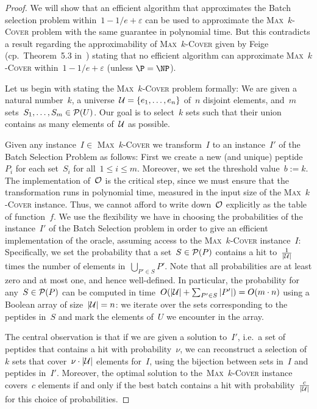 \documentclass[11pt]{article}
\newcommand\maxkcover{\textsc{Max~$k$-Cover}\xspace}
\begin{document}
\begin{proof}
We will show that an efficient algorithm that approximates the Batch selection problem within~$1 - 1/e + \varepsilon$ can be used to approximate the \maxkcover problem with the same guarantee in polynomial time. But this contradicts a result regarding the approximability of \maxkcover given by Feige (cp.\ Theorem~5.3 in~\cite{feige98}) stating that no efficient algorithm can approximate \maxkcover within~$1 - 1/e + \varepsilon$ (unless $\P = \NP$).

Let us begin with stating the \maxkcover problem formally: We are given a natural number~$k$, a universe~${\cal U} = \{e_1,\ldots,e_n\}$ of~$n$ disjoint elements, and~$m$ sets~$S_1,\ldots,S_m \in {\cal P}(U)$. Our goal is to select~$k$ sets such that their union contains as many elements of~$\cal U$ as possible.

Given any instance~$I \in$ \maxkcover we transform~$I$ to an instance~$I'$ of the Batch Selection Problem as follows: First we create a new (and unique) peptide~$P_i$ for each set~$S_i$ for all~$1 \leq i \leq m$. Moreover, we set the threshold value~$b := k$.
%
The implementation of~$\cal O$ is the critical step, since we must ensure that the transformation runs in polynomial time, measured in the input size of the \maxkcover instance. Thus, we cannot afford to write down~$\cal O$ explicitly as the table of function~$f$. We use the flexibility we have in choosing the probabilities of the instance~$I'$ of the Batch Selection problem in order to give an efficient implementation of the oracle, assuming access to the \maxkcover instance~$I$:
Specifically, we set the probability that a set~$S \in {\cal P}(P)$ contains a hit to~$\frac{1}{|\cal U|}$ times the number of elements in~$\bigcup_{P' \in S} P'$. Note that all probabilities are at least zero and at most one, and hence well-defined.
%
In particular, the probability for any~$S \in {\cal P}(P)$ can be computed in time~$O(|{\cal U}| + \sum_{P' \in S}{|P'|}) = O(m\cdot n)$ using a Boolean array of size~$|{\cal U}| = n$: we iterate over the sets corresponding to the peptides in~$S$ and mark the elements of~$U$ we encounter in the array.

The central observation is that if we are given a solution to~$I'$, i.e.\ a set of peptides that contains a hit with probability~$\nu$, we can reconstruct a selection of~$k$ sets that cover~$\nu \cdot |{\cal U}|$ elements for~$I$, using the bijection between sets in~$I$ and peptides in~$I'$.
%
Moreover, the optimal solution to the~\maxkcover instance covers~$c$ elements if and only if the best batch contains a hit with probability~$\frac{c}{|\cal U|}$ for this choice of probabilities. 


\end{proof}
\end{document}
